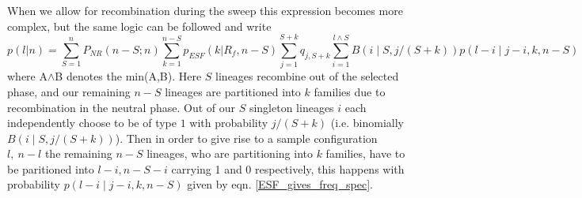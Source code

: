\documentclass[a4paper,10pt]{article}
\begin{document}
When we allow for recombination during the sweep this expression becomes more complex, but the same logic can be followed and write
\begin{equation}
p(l | n) = \sum_{S=1}^n P_{NR}(n-S; n) \sum_{k=1}^{n-S} p_{ESF}(k | R_f,n-S) \sum_{j=1}^{S+k} q_{j,S+k}
\sum_{i=1}^{l \wedge S} B(i \mid S,j/(S+k)) p(l-i \mid j-i,k,n-S )
\end{equation}
where A$\wedge$B denotes the min(A,B). Here $S$ lineages recombine out of the selected phase, and our remaining $n-S$ lineages are partitioned into $k$ families due to recombination in the neutral phase. Out of our $S$ singleton lineages $i$ each independently choose to be of type $1$ with probability $j/(S+k)$ (i.e. binomially $ B(i \mid S,j/(S+k))$). Then in order to give rise to a sample configuration $l,~n-l$ the remaining $n-S$ lineages, who are partitioning into $k$ families, have to be paritioned into $l-i,n-S-i$ carrying 1 and 0 respectively, this happens with probability $p(l-i \mid j-i,k,n-S )$ given by eqn. \eqref{ESF_gives_freq_spec}.   
\end{document}
